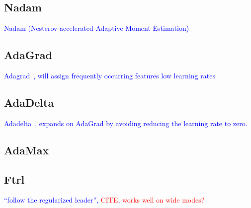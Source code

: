 \subsection{Nadam}

\textcolor{blue}{Nadam (Nesterov-accelerated Adaptive Moment Estimation)~\cite{dozat2016incorporating}}

\subsection{AdaGrad}

\textcolor{blue}{Adagrad~\cite{duchi2011adaptive}, will assign frequently occurring features low learning rates}

\subsection{AdaDelta}

\textcolor{blue}{Adadelta~\cite{zeiler2012adadelta}, expands on AdaGrad by avoiding reducing the learning rate to zero.}

\subsection{AdaMax}

\subsection{Ftrl}

\textcolor{blue}{``follow the regularized leader'', \textcolor{red}{CITE}, \textcolor{red}{works well on wide modes?}}





